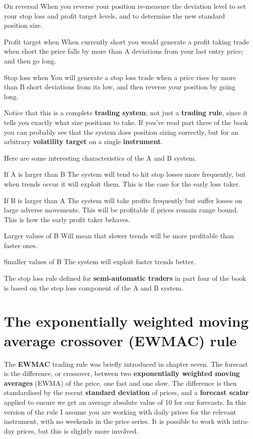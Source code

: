On reversal When you reverse your position re-measure the deviation level to set your stop loss and profit target levels, and to determine the new standard position size.

Profit target when When currently short you would generate a profit taking trade when short the price falls by more than A deviations from your last entry price; and then go long.

Stop loss when You will generate a stop loss trade when a price rises by more than B short deviations from its low, and then reverse your position by going long.

Notice that this is a complete \textbf{trading system}, not just a \textbf{trading rule}, since it tells you exactly what size positions to take. If you've read part three of the book you can probably see that the system does position sizing correctly, but for an arbitrary \textbf{volatility target} on a single \textbf{instrument}.

Here are some interesting characteristics of the A and B system.

If A is larger than B The system will tend to hit stop losses more frequently, but when trends occur it will exploit them. This is the case for the early loss taker.

If B is larger than A The system will take profits frequently but suffer losses on large adverse movements. This will be profitable if prices remain range bound. This is how the early profit taker behaves.

Larger values of B Will mean that slower trends will be more profitable than faster ones.

Smaller values of B The system will exploit faster trends better.

The stop loss rule defined for \textbf{semi-automatic traders} in part four of the book is based on the stop loss component of the A and B system.

\section*{The exponentially weighted moving average crossover (EWMAC) rule}  {}

The \textbf{EWMAC} trading rule was briefly introduced in chapter seven. The forecast is the difference, or crossover, between two \textbf{exponentially weighted moving averages} (EWMA) of the price, one fast and one slow. The difference is then standardised by the recent \textbf{standard deviation} of prices, and a \textbf{forecast scalar} applied to ensure we get an average absolute value of 10 for our forecasts.
In this version of the rule I assume you are working with daily prices for the relevant instrument, with no weekends in the price series. It is possible to work with intra-day prices, but this is slightly more involved.

